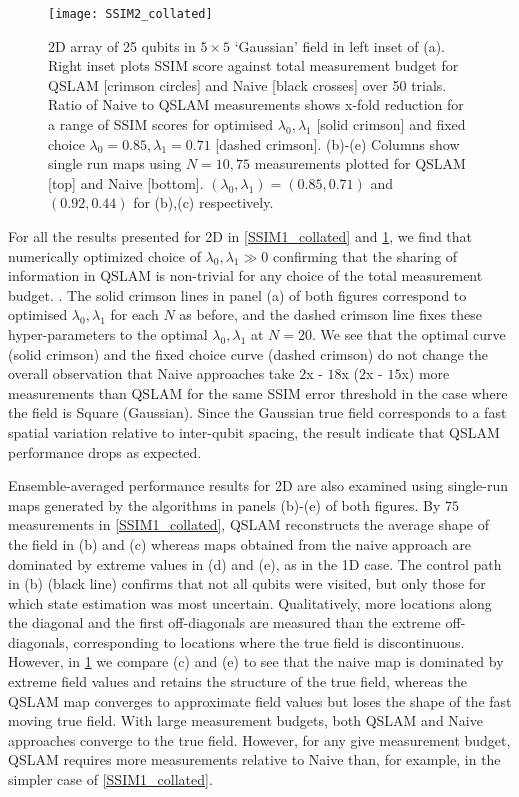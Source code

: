 \begin{figure}
	\texttt{[image: SSIM2\_collated]}
	\caption{\label{SSIM2_collated} 2D array of 25 qubits in $5 \times 5$  `Gaussian' field in left inset of (a).  Right inset plots SSIM score against total measurement budget for QSLAM [crimson circles] and Naive [black crosses] over 50 trials. Ratio of Naive to QSLAM measurements shows x-fold reduction for a range of SSIM scores for optimised $\lambda_0, \lambda_1$ [solid crimson] and fixed choice $\lambda_0 = 0.85, \lambda_1 = 0.71$ [dashed crimson]. (b)-(e) Columns show single run maps using $N=10, 75$ measurements plotted for QSLAM [top] and Naive [bottom]. $(\lambda_0, \lambda_1)= (0.85, 0.71)$ and $ (0.92, 0.44)$ for (b),(c) respectively.}    	
\end{figure} 

For all the results presented for 2D in  \cref{SSIM1_collated} and \cref{SSIM2_collated}, we find that numerically optimized choice of $\lambda_0, \lambda_1 \gg 0$ confirming that the sharing of information in QSLAM is non-trivial for any choice of the total measurement budget. .
The solid crimson lines in panel (a) of both figures correspond to optimised $\lambda_0, \lambda_1 $  for each $N$ as before,  and the dashed crimson line fixes these hyper-parameters to the optimal $\lambda_0, \lambda_1 $ at $N = 20$. We see that the optimal curve (solid crimson)  and the fixed choice curve (dashed crimson) do not change the overall observation that Naive approaches take $2$x - $18$x ($2$x - $15$x) more measurements than QSLAM for the same SSIM error threshold in the case where the field is Square (Gaussian). Since the Gaussian true field corresponds to a fast spatial variation relative to inter-qubit spacing, the result indicate that QSLAM performance drops as expected.

Ensemble-averaged performance results for 2D are also examined using single-run maps generated by the algorithms in panels (b)-(e) of both figures. By $75$ measurements in \cref{SSIM1_collated}, QSLAM reconstructs the average shape  of the field  in (b) and (c) whereas maps obtained from the naive approach are dominated by extreme values in (d) and (e), as in the 1D case. The control path in (b) (black line) confirms that not all qubits were visited, but only those for which state estimation was most uncertain. Qualitatively, more locations along the diagonal and the first off-diagonals are measured than the extreme off-diagonals, corresponding to locations where the true field is discontinuous. However, in \cref{SSIM2_collated} we compare (c) and (e) to see that the naive map is dominated by extreme field values and retains the structure of the true field, whereas the QSLAM map converges to approximate field values but loses the shape of the fast moving true field. With large measurement budgets, both QSLAM and Naive approaches converge to the true field. However,  for any give measurement budget, QSLAM requires more measurements relative to Naive than, for example, in the simpler case of \cref{SSIM1_collated}.

